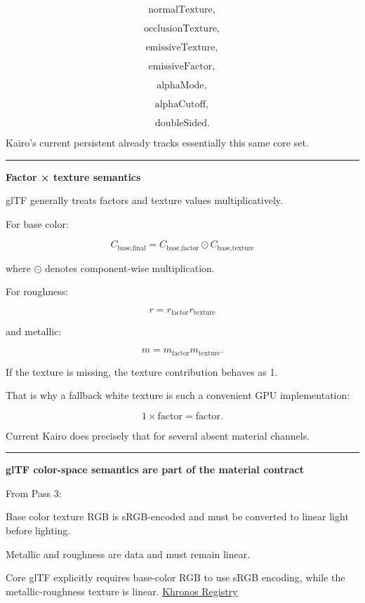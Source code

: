 \[
\text{normalTexture},
\]

\[
\text{occlusionTexture},
\]

\[
\text{emissiveTexture},
\]

\[
\text{emissiveFactor},
\]

\[
\text{alphaMode},
\]

\[
\text{alphaCutoff},
\]

\[
\text{doubleSided}.
\]

Kairo's current persistent  already tracks essentially this same core set.

\begin{center}\rule{0.5\linewidth}{0.5pt}\end{center}

\textbf{Factor × texture semantics}

glTF generally treats factors and texture values multiplicatively.

For base color:

\[
\boxed{
C_{\text{base,final}}
=
C_{\text{base,factor}}
\odot
C_{\text{base,texture}}
}
\]

where \(\odot\) denotes component-wise multiplication.

For roughness:

\[
\boxed{
r=
r_{\text{factor}}
r_{\text{texture}}
}
\]

and metallic:

\[
\boxed{
m=
m_{\text{factor}}
m_{\text{texture}}.
}
\]

If the texture is missing, the texture contribution behaves as 1.

That is why a fallback white texture is such a convenient GPU implementation:

\[
1\times\text{factor}
=
\text{factor}.
\]

Current Kairo does precisely that for several absent material channels.

\begin{center}\rule{0.5\linewidth}{0.5pt}\end{center}

\textbf{glTF color-space semantics are part of the material contract}

From Pass 3:

Base color texture RGB is sRGB-encoded and must be converted to linear light before lighting.

Metallic and roughness are data and must remain linear.

Core glTF explicitly requires base-color RGB to use sRGB encoding, while the metallic-roughness texture is linear. \href{https://registry.khronos.org/glTF/specs/2.0/glTF-2.0.html?utm_source=chatgpt.com}{Khronos Registry}

